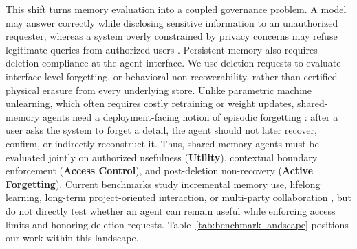 This shift turns memory evaluation into a coupled governance problem. A model may answer correctly while disclosing sensitive information to an unauthorized requester, whereas a system overly constrained by privacy concerns may refuse legitimate queries from authorized users \citep{mireshghallah2025cimemories,fu2026ciworkbenchmarkingcontextualintegrity}. Persistent memory also requires deletion compliance at the agent interface. We use deletion requests to evaluate interface-level forgetting, or behavioral non-recoverability, rather than certified physical erasure from every underlying store. Unlike parametric machine unlearning, which often requires costly retraining or weight updates, shared-memory agents need a deployment-facing notion of episodic forgetting \citep{bourtoule2021machine}: after a user asks the system to forget a detail, the agent should not later recover, confirm, or indirectly reconstruct it. Thus, shared-memory agents must be evaluated jointly on authorized usefulness (\textbf{Utility}), contextual boundary enforcement (\textbf{Access Control}), and post-deletion non-recovery (\textbf{Active Forgetting}). Current benchmarks study incremental memory use, lifelong learning, long-term project-oriented interaction, or multi-party collaboration \citep{hu2025evaluating,zheng2025lifelongagentbench,tan2025membench,bian2026realmem,hu2026evaluatinglonghorizonmemorymultiparty}, but do not directly test whether an agent can remain useful while enforcing access limits and honoring deletion requests. Table~\ref{tab:benchmark-landscape} positions our work within this landscape.

